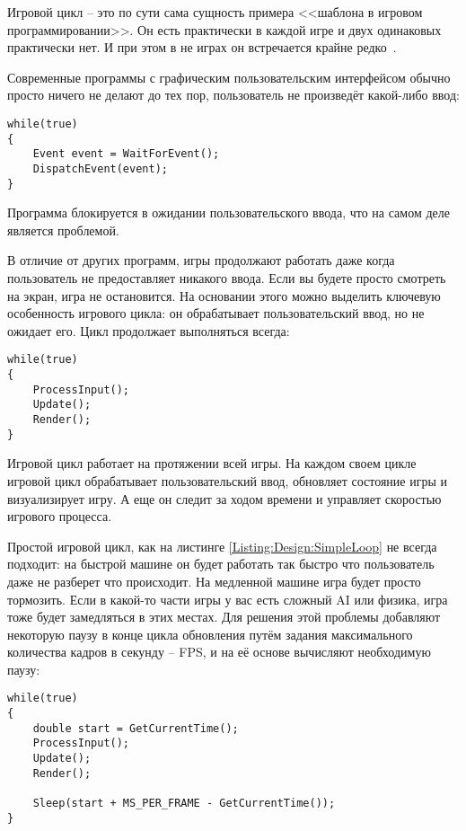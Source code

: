 Игровой цикл -- это по сути сама сущность примера <<шаблона в игровом программировании>>. Он есть практически в каждой игре и двух одинаковых практически нет. И при этом в не играх он встречается крайне редко~\cite{GameProgrammingPatterns}.

Современные программы с графическим пользовательским интерфейсом обычно просто ничего не делают до тех пор, пользователь не произведёт какой-либо ввод:

\begin{lstlisting}[caption={Пример цикла ожидания ввода}]
while(true)
{
    Event event = WaitForEvent();
    DispatchEvent(event);
}
\end{lstlisting}

Программа блокируется в ожидании пользовательского ввода, что на самом деле является проблемой.

В отличие от других программ, игры продолжают работать даже когда пользователь не предоставляет никакого ввода. Если вы будете просто смотреть на экран, игра не остановится. На основании этого можно выделить ключевую особенность игрового цикла: он обрабатывает пользовательский ввод, но не ожидает его. Цикл продолжает выполняться всегда:

\begin{lstlisting}[caption={Пример простого игрового цикла}, label=Listing:Design:SimpleLoop]
while(true)
{
    ProcessInput();
    Update();
    Render();
}
\end{lstlisting}

Игровой цикл работает на протяжении всей игры. На каждом своем цикле игровой цикл обрабатывает пользовательский ввод, обновляет состояние игры и визуализирует игру. А еще он следит за ходом времени и управляет скоростью игрового процесса.

Простой игровой цикл, как на листинге \ref{Listing:Design:SimpleLoop} не всегда подходит: на быстрой машине он будет работать так быстро что пользователь даже не разберет что происходит. На медленной машине игра будет просто тормозить. Если в какой-то части игры у вас есть сложный AI или физика, игра тоже будет замедляться в этих местах. Для решения этой проблемы добавляют некоторую паузу в конце цикла обновления путём задания максимального количества кадров в секунду -- FPS, и на её основе вычисляют необходимую паузу:

\begin{lstlisting}[caption={Пример игрового цикла с паузой}, label=Listing:Design:PauseLoop]
while(true)
{
    double start = GetCurrentTime();
    ProcessInput();
    Update();
    Render();

    Sleep(start + MS_PER_FRAME - GetCurrentTime());
}
\end{lstlisting}


